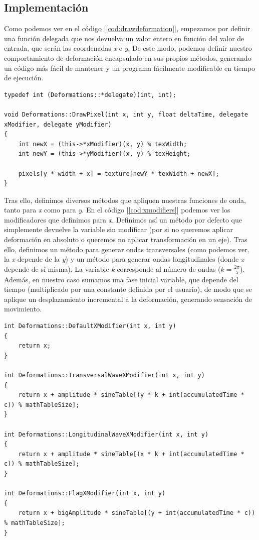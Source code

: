 \subsection{Implementación}

Como podemos ver en el código [\ref{cod:drawdeformation}], empezamos por definir una función delegada que nos devuelva un valor entero en función del valor de entrada, que serán las coordenadas \emph{x} e \emph{y}. De este modo, podemos definir nuestro comportamiento de deformación encapsulado en sus propios métodos, generando un código más fácil de mantener y un programa fácilmente modificable en tiempo de ejecución.\\

\begin{lstlisting}[style=C-color, caption={Dibujado de un pixel aplicando una función que modifica el acceso a textura}, label=cod:drawdeformation]
typedef int (Deformations::*delegate)(int, int);

void Deformations::DrawPixel(int x, int y, float deltaTime, delegate xModifier, delegate yModifier)
{
    int newX = (this->*xModifier)(x, y) % texWidth;
    int newY = (this->*yModifier)(x, y) % texHeight;

    pixels[y * width + x] = texture[newY * texWidth + newX];
}
\end{lstlisting}

Tras ello, definimos diversos métodos que apliquen nuestras funciones de onda, tanto para \emph{x} como para \emph{y}. En el código [\ref{cod:xmodifiers}] podemos ver los modificadores que definimos para \emph{x}. Definimos así un método por defecto que simplemente devuelve la variable sin modificar (por si no queremos aplicar deformación en absoluto o queremos no aplicar transformación en un eje). Tras ello, definimos un método para generar ondas transversales (como podemos ver, la \emph{x} depende de la \emph{y}) y un método para generar ondas longitudinales (donde \emph{x} depende de sí misma). La variable \emph{k} corresponde al número de ondas (\(k = \frac{2 \pi}{\lambda}\)). Además, en nuestro caso sumamos una fase inicial variable, que depende del tiempo (multiplicado por una constante definida por el usuario), de modo que se aplique un desplazamiento incremental a la deformación, generando sensación de movimiento.\\

\begin{lstlisting}[style=C-color, caption={Funciones de deformación en X}, label=cod:xmodifiers]
int Deformations::DefaultXModifier(int x, int y)
{
    return x;
}

int Deformations::TransversalWaveXModifier(int x, int y)
{
    return x + amplitude * sineTable[(y * k + int(accumulatedTime * c)) % mathTableSize];
}

int Deformations::LongitudinalWaveXModifier(int x, int y)
{
    return x + amplitude * sineTable[(x * k + int(accumulatedTime * c)) % mathTableSize];
}

int Deformations::FlagXModifier(int x, int y)
{
    return x + bigAmplitude * sineTable[(y + int(accumulatedTime * c)) % mathTableSize];
}
\end{lstlisting}

